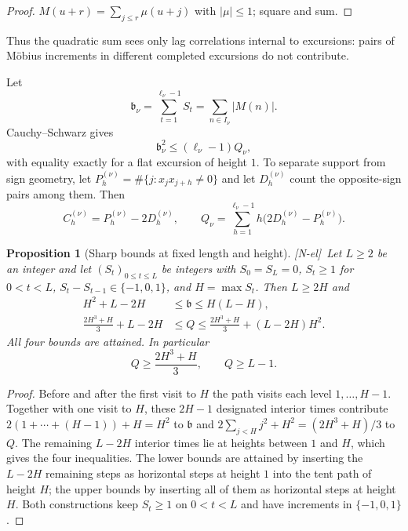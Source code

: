\documentclass[11pt,reqno]{amsart}
\numberwithin{equation}{section}
\theoremstyle{plain}
\newtheorem{proposition}[theorem]{Proposition}
\theoremstyle{definition}
\theoremstyle{remark}
\newcommand{\tagNE}{\textup{[N-el]}}
\begin{document}
\begin{proof}
$M(u+r)=\sum_{j\le r}\mu(u+j)$ with $|\mu|\le1$; square and sum.
\end{proof}


Thus the quadratic sum sees only lag correlations internal to excursions:
pairs of M\"obius increments in different completed excursions do not
contribute.

Let
\begin{equation}
\label{eq:beta_def}
\mathfrak b_\nu=\sum_{t=1}^{\ell_\nu-1}S_t=\sum_{n\in I_\nu}|M(n)|.
\end{equation}
Cauchy--Schwarz gives
\begin{equation}
\label{eq:beta-Q}
\mathfrak b_\nu^2\le(\ell_\nu-1)Q_\nu,
\end{equation}
with equality exactly for a flat excursion of height $1$. To separate
support from sign geometry, let $P_h^{(\nu)}=\#\{j:x_jx_{j+h}\ne0\}$ and let
$D_h^{(\nu)}$ count the opposite-sign pairs among them. Then
\begin{equation}
\label{eq:C-P-D}
C_h^{(\nu)}=P_h^{(\nu)}-2D_h^{(\nu)},\qquad
Q_\nu=\sum_{h=1}^{\ell_\nu-1}h\bigl(2D_h^{(\nu)}-P_h^{(\nu)}\bigr).
\end{equation}

\begin{proposition}[Sharp bounds at fixed length and height]
\label{prop:sharp-LH}
\tagNE\ Let $L\ge2$ be an integer and let $(S_t)_{0\le t\le L}$ be integers
with $S_0=S_L=0$, $S_t\ge1$ for $0<t<L$, $S_t-S_{t-1}\in\{-1,0,1\}$, and
$H=\max S_t$. Then $L\ge2H$ and
\begin{align}
H^2+L-2H&\le\mathfrak b\le H(L-H),\label{eq:beta-LH}\\
\frac{2H^3+H}{3}+L-2H&\le Q\le
\frac{2H^3+H}{3}+(L-2H)H^2.\label{eq:Q-LH}
\end{align}
All four bounds are attained. In particular
\begin{equation}
\label{eq:height_Q_min}
Q\ge\frac{2H^3+H}{3},\qquad Q\ge L-1.
\end{equation}
\end{proposition}

\begin{proof}
Before and after the first visit to $H$ the path visits each level
$1,\dots,H-1$. Together with one visit to $H$, these $2H-1$ designated
interior times contribute $2(1+\cdots+(H-1))+H=H^2$ to $\mathfrak b$ and
$2\sum_{j<H}j^2+H^2=(2H^3+H)/3$ to $Q$. The remaining $L-2H$ interior times
lie at heights between $1$ and $H$, which gives the four inequalities. The
lower bounds are attained by inserting the $L-2H$ remaining steps as
horizontal steps at height $1$ into the tent path of height $H$; the upper
bounds by inserting all of them as horizontal steps at height $H$. Both
constructions keep $S_t\ge1$ on $0<t<L$ and have increments in
$\{-1,0,1\}$.
\end{proof}
\end{document}
